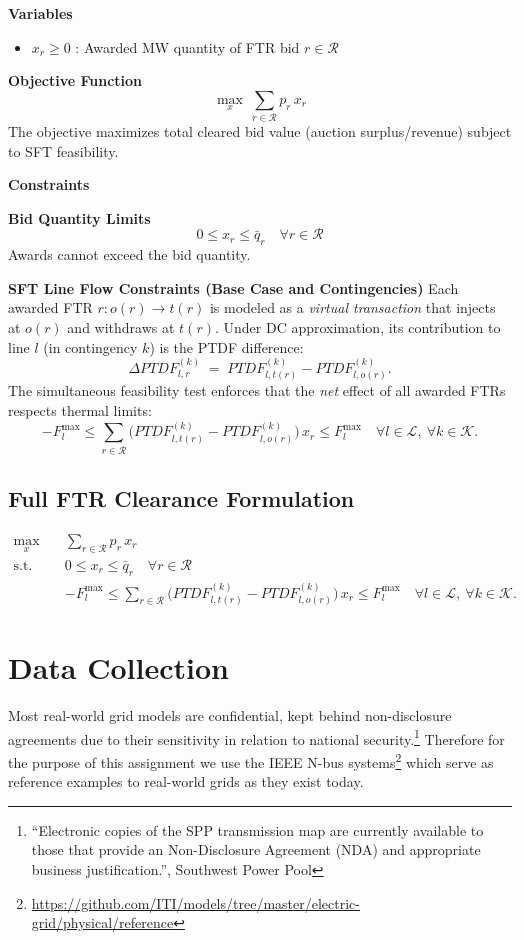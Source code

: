 \documentclass[11pt]{article}
\begin{document}
\textbf{Variables}
\begin{itemize}
  \item $x_r \ge 0$ : Awarded MW quantity of FTR bid $r\in\mathcal{R}$
\end{itemize}

\textbf{Objective Function}
\begin{equation}
\max_{x}\ \sum_{r\in\mathcal{R}} p_r\,x_r
\tag{1}
\end{equation}
The objective maximizes total cleared bid value (auction surplus/revenue) subject to SFT feasibility.

\textbf{Constraints}

\textbf{Bid Quantity Limits}
\begin{equation}
0 \le x_r \le \bar q_r \quad \forall r\in\mathcal{R}
\tag{2}
\end{equation}
Awards cannot exceed the bid quantity.

\textbf{SFT Line Flow Constraints (Base Case and Contingencies)}
Each awarded FTR $r: o(r)\to t(r)$ is modeled as a \emph{virtual transaction} that injects at $o(r)$ and
withdraws at $t(r)$. Under DC approximation, its contribution to line $l$ (in contingency $k$) is the PTDF
difference:
\[
\Delta PTDF^{(k)}_{l,r} \;=\; PTDF^{(k)}_{l,t(r)} - PTDF^{(k)}_{l,o(r)}.
\]
The simultaneous feasibility test enforces that the \emph{net} effect of all awarded FTRs respects thermal limits:
\begin{equation}
- F_l^{\max}
\le
\sum_{r\in\mathcal{R}} \Big( PTDF^{(k)}_{l,t(r)} - PTDF^{(k)}_{l,o(r)} \Big)\,x_r
\le
F_l^{\max}
\quad \forall l\in\mathcal{L},\ \forall k\in\mathcal{K}.
\tag{3}
\end{equation}

\subsection{Full FTR Clearance Formulation}
\begin{align}
\max_{x}\quad & \sum_{r\in\mathcal{R}} p_r\,x_r
\tag{4}\\[4pt]
\text{s.t.}\quad
& 0 \le x_r \le \bar q_r \quad \forall r\in\mathcal{R}
\tag{5}\\[4pt]
& - F_l^{\max}
\le
\sum_{r\in\mathcal{R}} \Big( PTDF^{(k)}_{l,t(r)} - PTDF^{(k)}_{l,o(r)} \Big)\,x_r
\le
F_l^{\max}
\quad \forall l\in\mathcal{L},\ \forall k\in\mathcal{K}.
\tag{6}
\end{align}

\section{Data Collection}
Most real-world grid models are confidential, kept behind non-disclosure agreements due to their sensitivity in relation to national security.\footnote{``Electronic copies of the SPP transmission map are currently available to those that provide an Non-Disclosure Agreement (NDA) and appropriate business justification.'', Southwest Power Pool} Therefore for the purpose of this assignment we use the IEEE N-bus systems\footnote{\url{https://github.com/ITI/models/tree/master/electric-grid/physical/reference}} which serve as reference examples to real-world grids as they exist today.
\end{document}
